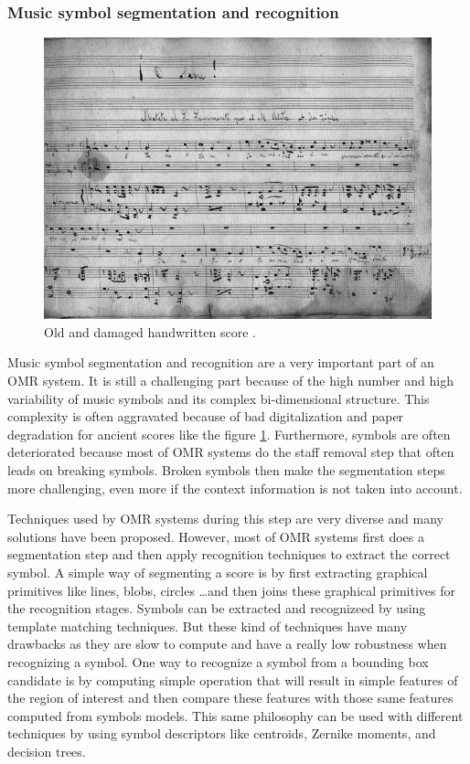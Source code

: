 \documentclass[11pt]{sdm}
\begin{document}
\subsubsection{Music symbol segmentation and recognition}

\begin{figure}[btp]
  \centering
  \includegraphics[scale=0.5]{img/old_score}
  \caption{\label{old_score} Old and damaged handwritten score \cite{fornes_analysis_2014}. }
\end{figure}
Music symbol segmentation and recognition are a very important part of an OMR system.
It is still a challenging part because of the high number and high variability of music symbols and its complex bi-dimensional structure.
This complexity is often aggravated because of bad digitalization and paper degradation for ancient scores like the figure \ref{old_score}.
Furthermore, symbols are often deteriorated because most of OMR systems do the staff removal step that often leads on breaking symbols.
Broken symbols then make the segmentation steps more challenging, even more if the context information is not taken into account.

Techniques used by OMR systems during this step are very diverse and many solutions have been proposed.
However, most of OMR systems first does a segmentation step and then apply recognition techniques to extract the correct symbol.
A simple way of segmenting a score is by first extracting graphical primitives like lines, blobs, circles \ldots and then joins these graphical primitives for the recognition stages.
Symbols can be extracted and recognizeed by using template matching techniques.
But these kind of techniques have many drawbacks as they are slow to compute and have a really low robustness when recognizing a symbol.
One way to recognize a symbol from a bounding box candidate is by computing simple operation that will result in simple features of the region of interest and then compare these features with those same features computed from symbols models.
This same philosophy can be used with different techniques by using symbol descriptors like centroids, Zernike moments, and decision trees.
\end{document}

